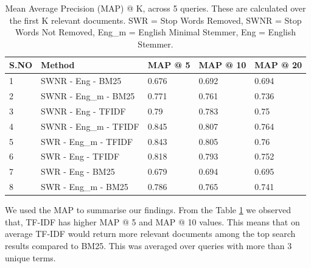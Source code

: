 \documentclass[report,draft*]{aaltoseries}
\begin{document}
\begin{table}[h!]
\centering
\caption{Mean Average Precision (MAP) @ K, across 5 queries. These are calculated over the first K relevant documents. SWR = Stop Words Removed, SWNR = Stop Words Not Removed, Eng\_m = English Minimal Stemmer, Eng = English Stemmer.}
\label{tblMAP}
\begin{tabular}{@{}lllll@{}}
\toprule
S.NO & Method                & MAP @ 5 & MAP @ 10 & MAP @ 20 \\ \midrule
1    & SWNR - Eng - BM25     & 0.676   & 0.692    & 0.694    \\
2    & SWNR - Eng\_m - BM25  & 0.771   & 0.761    & 0.736    \\
3    & SWNR - Eng - TFIDF    & 0.79    & 0.783    & 0.75     \\
4    & SWNR - Eng\_m - TFIDF & 0.845   & 0.807    & 0.764    \\
5    & SWR - Eng\_m - TFIDF  & 0.843   & 0.805    & 0.76     \\
6    & SWR - Eng - TFIDF     & 0.818   & 0.793    & 0.752    \\
7    & SWR - Eng - BM25      & 0.679   & 0.694    & 0.695    \\
8    & SWR - Eng\_m - BM25   & 0.786   & 0.765    & 0.741    \\ \bottomrule
\end{tabular}
\end{table}
We used the MAP to summarise our findings. From the Table \ref{tblMAP} we observed that, TF-IDF has higher MAP @ 5 and MAP @ 10 values. This means that on average TF-IDF would return more relevant documents among the top search results compared to BM25. This was averaged over queries with more than 3 unique terms.
\end{document}
